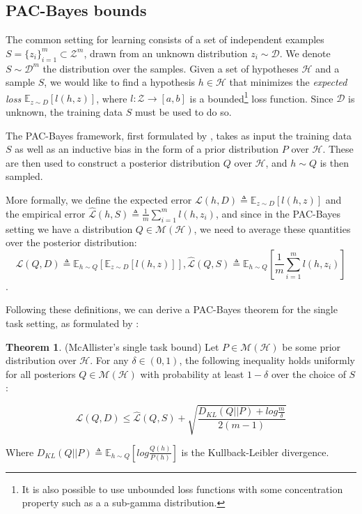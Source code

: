 \documentclass{article}
\theoremstyle{definition}
\newtheorem{theorem}{Theorem}[section]
\newcommand{\Expect}[2]{\mathbb{E}_{#1}\left [#2 \right ]}
\begin{document}
\subsection{PAC-Bayes bounds}

The common setting for learning consists of a set of independent examples $S=\{z_i\}_{i=1}^{m}\subset \mathcal{Z}^m$, drawn from an unknown distribution $z_i\sim \mathcal{D}$. We denote $S\sim \mathcal{D}^m$ the distribution over the samples. Given a set of hypotheses $\mathcal{H}$ and a sample $S$, we would like to find a hypothesis $h\in \mathcal{H}$ that minimizes the \emph{expected loss} $\Expect{z\sim D}{l(h,z)}$, where $l:\mathcal{Z}\rightarrow [a,b]$ is a bounded\footnote{It is also possible to use unbounded loss functions with some concentration property such as a a sub-gamma distribution.} loss function.
Since $\mathcal{D}$ is unknown, the training data $S$ must be used to do so. 

The PAC-Bayes framework, first formulated by \citet{Mcallester}, takes as input the training data $S$ as well as an inductive bias in the form of a prior distribution $P$ over $\mathcal{H}$. These are then used to construct a posterior distribution $Q$ over $\mathcal{H}$, and $h\sim Q$ is then sampled.

More formally, we define the expected error $\mathcal{L}(h, D)\triangleq \Expect{z\sim D}{l(h,z)}$ and the empirical error $\hat{\mathcal{L}}(h, S)\triangleq \frac{1}{m}\sum_{i=1}^{m} l(h,z_i)$, and since in the PAC-Bayes setting we have a distribution $Q\in \mathcal{M}(\mathcal{H})$, we need to average these quantities over the posterior distribution:
$$\mathcal{L}(Q, D)\triangleq \Expect{h\sim Q}{\Expect{z\sim D}{l(h,z)}}, \hat{\mathcal{L}}(Q, S)\triangleq \Expect{h\sim Q}{\frac{1}{m}\sum_{i=1}^{m} l(h,z_i)}$$.

Following these definitions, we can derive a PAC-Bayes theorem for the single task setting, as formulated by \citet{Mcallester}:

\begin{theorem} (McAllister's single task bound) \label{thm:classic-pb}
	Let $P\in \mathcal{M}(\mathcal{H})$ be some prior distribution over $\mathcal{H}$.
	For any $\delta \in (0,1)$, the following inequality holds uniformly for all posteriors $Q\in \mathcal{M}(\mathcal{H})$ with probability at least $1-\delta$ over the choice of $S$:
	
	$$\mathcal{L}(Q, D) \leq \hat{\mathcal{L}}(Q, S)+\sqrt{\frac{D_{KL}(Q||P)+log\frac{m}{\delta}}{2(m-1)}}$$
	
	Where $D_{KL}(Q||P)\triangleq \Expect{h\sim Q}{log\frac{Q(h)}{P(h)}}$ is the Kullback-Leibler divergence.
\end{theorem}
\end{document}
